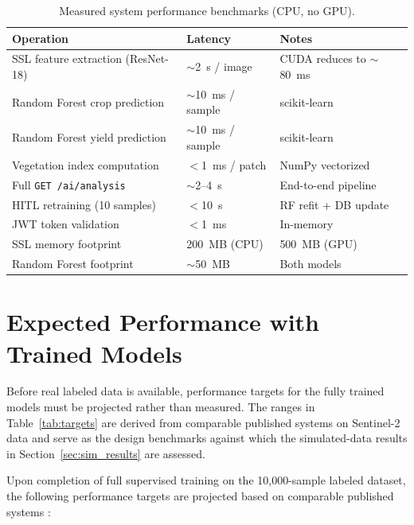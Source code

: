 \documentclass[12pt,a4paper,oneside]{report}
\begin{document}
\begin{table}[h]
\centering
\caption{Measured system performance benchmarks (CPU, no GPU).}
\label{tab:benchmarks}
\begin{tabular}{lll}
\toprule
\textbf{Operation} & \textbf{Latency} & \textbf{Notes} \\
\midrule
SSL feature extraction (ResNet-18) & $\sim$2~s / image    & CUDA reduces to $\sim$80~ms \\
Random Forest crop prediction      & $\sim$10~ms / sample & scikit-learn \\
Random Forest yield prediction     & $\sim$10~ms / sample & scikit-learn \\
Vegetation index computation       & $<$1~ms / patch      & NumPy vectorized \\
Full \texttt{GET /ai/analysis}     & $\sim$2--4~s         & End-to-end pipeline \\
HITL retraining (10 samples)       & $<$10~s              & RF refit + DB update \\
JWT token validation               & $<$1~ms              & In-memory \\
SSL memory footprint               & 200~MB (CPU)         & 500~MB (GPU) \\
Random Forest footprint            & $\sim$50~MB          & Both models \\
\bottomrule
\end{tabular}
\end{table}

\section{Expected Performance with Trained Models}

Before real labeled data is available, performance targets for the fully trained models must be projected rather than measured. The ranges in Table~\ref{tab:targets} are derived from comparable published systems on Sentinel-2 data and serve as the design benchmarks against which the simulated-data results in Section~\ref{sec:sim_results} are assessed.

Upon completion of full supervised training on the 10,000-sample labeled dataset,
the following performance targets are projected based on comparable published systems
\cite{belgiu2016random, kussul2017deep, jeong2016random}:
\end{document}
